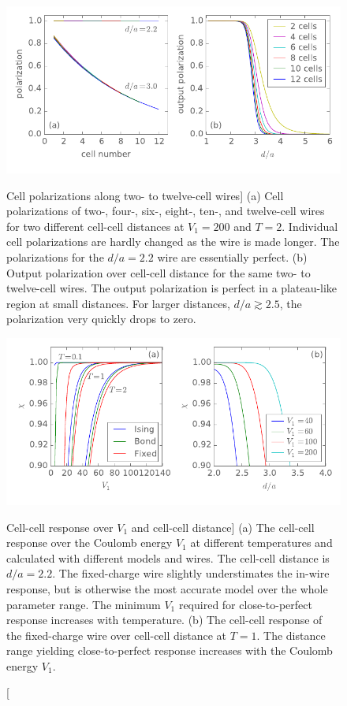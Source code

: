 \begin{figure}
  \center
  \includegraphics{wire_polarization}
  \vspace*{-0.5cm}
  \caption
  [Cell polarizations along two- to twelve-cell wires]
  {
  \label{fig:wire_polarization}
  (a) Cell polarizations of two-, four-, six-, eight-, ten-, and twelve-cell
  wires for two different cell-cell distances at $V_1 = 200$ and $T = 2$. 
  Individual cell polarizations are
  hardly changed as the wire is made longer. The polarizations for the $d/a =
  2.2$ wire are essentially perfect.
  (b) Output polarization over cell-cell distance for the same two- to
  twelve-cell wires. The
  output polarization is perfect in a plateau-like region at small distances.
  For larger distances, $d/a \gtrsim 2.5$, the polarization very quickly drops
  to zero.
  }

  \vspace*{0.75cm}
  
  \includegraphics{chis}
  \vspace*{-0.5cm}
  \caption
  [Cell-cell response over $V_1$ and cell-cell distance]
  {
  \label{fig:chis}
  (a) The cell-cell response over the Coulomb energy $V_1$ at different
  temperatures and calculated with different models and wires. The cell-cell
  distance is $d/a = 2.2$. The fixed-charge
  wire slightly understimates the in-wire response, but is otherwise the most
  accurate model over the whole parameter range. The minimum $V_1$ required for
  close-to-perfect response increases with temperature.
  (b) The cell-cell response of the fixed-charge wire over cell-cell distance at
  $T = 1$. The distance range yielding close-to-perfect response increases with
  the Coulomb energy $V_1$.
  }
\end{figure}

